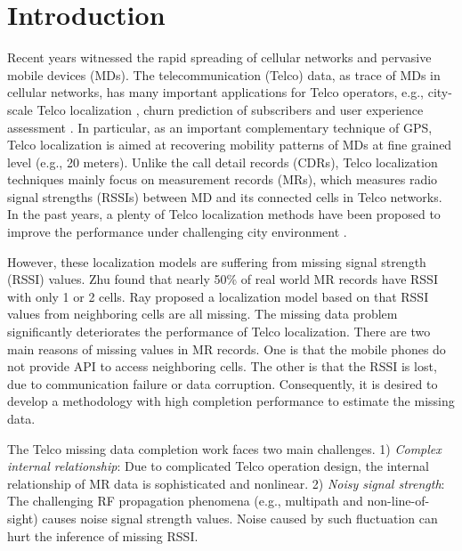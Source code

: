 \section{Introduction}
Recent years witnessed the rapid spreading of cellular networks and pervasive mobile devices (MDs). The telecommunication (Telco) data, as trace of MDs in cellular networks, has many important applications for Telco operators, e.g., city-scale Telco localization \cite{DBLP:conf/cikm/ZhuLYZZGDRZ16}, churn prediction of subscribers \cite{DBLP:conf/sigmod/HuangZYDLND0Z15} and user experience assessment \cite{DBLP:journals/tist/LuoZYDY16}. In particular, as an important complementary technique of GPS, Telco localization is aimed at recovering mobility patterns of MDs at fine grained level (e.g., 20 meters). Unlike the call detail records (CDRs), Telco localization techniques mainly focus on measurement records (MRs), which measures radio signal strengths (RSSIs) between MD and its connected cells in Telco networks. In the past years, a plenty of Telco localization methods have been proposed to improve the performance under challenging city environment \cite{DBLP:conf/icc/IbrahimY11, DBLP:conf/icc/HaraAYDZ11,DBLP:journals/tvt/IbrahimY12,DBLP:conf/infocom/RayDM16,DBLP:conf/infocom/MargoliesBBDJUV17}.

However, these localization models are suffering from missing signal strength (RSSI) values. Zhu \cite{DBLP:conf/cikm/ZhuLYZZGDRZ16} found that nearly 50\% of real world MR records have RSSI with only 1 or 2 cells. Ray \cite{DBLP:conf/infocom/RayDM16} proposed a localization model based on that RSSI values from neighboring cells are all missing. The missing data problem significantly deteriorates the performance of Telco localization. There are two main reasons of missing values in MR records. One is that the mobile phones do not provide API to access neighboring cells. The other is that the RSSI is lost, due to communication failure or data corruption. Consequently, it is desired to develop a methodology with high completion performance to estimate the missing data.

The Telco missing data completion work faces two main challenges. 1) \emph{Complex internal relationship}: Due to complicated Telco operation design, the internal relationship of MR data is sophisticated and nonlinear. 2) \emph{Noisy signal strength}: The challenging RF propagation phenomena (e.g., multipath and non-line-of-sight) causes noise signal strength values. Noise caused by such fluctuation can hurt the inference of missing RSSI.

